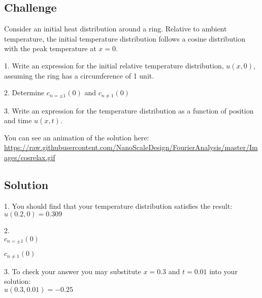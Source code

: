 \subsection*{Challenge}
Consider an initial heat distribution around a ring. Relative to ambient temperature, the initial temperature distribution follows a cosine distribution with the peak temperature at $x=0$.

1. Write an expression for the initial relative temperature distribution, $u(x,0)$, assuming the ring has a circumference of 1 unit.

2. Determine $c_{n=\pm 1}(0)$ and $c_{n \ne 1}(0)$

3. Write an expression for the temperature distribution as a function of position and time $u(x,t)$.

You can see an animation of the solution here:\\
\url{https://raw.githubusercontent.com/NanoScaleDesign/FourierAnalysis/master/Images/cosrelax.gif}

\subsection*{Solution}
1. You should find that your temperature distribution satisfies the result:\\
$u(0.2,0) = 0.309$

2.\\
$c_{n=\pm 1}(0)$\\

$c_{n \ne 1}(0)$\\

3. To check your answer you may substitute $x=0.3$ and $t=0.01$ into your solution:\\
$u(0.3,0.01) = -0.25$

